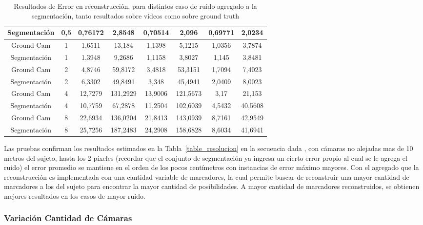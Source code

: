 \begin{table}[h]
\begin{tabular}{cc|c|c|c|c|c|c|}
\multicolumn{1}{|c|}{Segmentación} & 0,5 & 0,76172 & 2,8548 & 0,70514 & 2,096 & 0,69771 & 2,0234 \\ \hline
\multicolumn{1}{|c|}{Ground Cam} & 1 & 1,6511 & 13,184 & 1,1398 & 5,1215 & 1,0356 & 3,7874 \\ \hline
\multicolumn{1}{|c|}{Segmentación} & 1 & 1,3948 & 9,2686 & 1,1158 & 3,8027 & 1,145 & 3,8481 \\ \hline
\multicolumn{1}{|c|}{Ground Cam} & 2 & 4,8746 & 59,8172 & 3,4818 & 53,3151 & 1,7094 & 7,4023 \\ \hline
\multicolumn{1}{|c|}{Segmentación} & 2 & 6,3302 & 49,8491 & 3,348 & 45,4941 & 2,0409 & 8,0023 \\ \hline
\multicolumn{1}{|c|}{Ground Cam} & 4 & 12,7279 & 131,2929 & 13,9006 & 121,5673 & 3,17 & 21,153 \\ \hline
\multicolumn{1}{|c|}{Segmentación} & 4 & 10,7759 & 67,2878 & 11,2504 & 102,6039 & 4,5432 & 40,5608 \\ \hline
\multicolumn{1}{|c|}{Ground Cam} & 8 & 22,6934 & 136,0204 & 21,8413 & 143,0939 & 8,7161 & 42,9549 \\ \hline
\multicolumn{1}{|c|}{Segmentación} & 8 & 25,7256 & 187,2483 & 24,2908 & 158,6828 & 8,6034 & 41,6941 \\ \hline
\end{tabular}
\caption{Resultados de Error en reconstrucción, para distintos caso de ruido agregado a la segmentación, tanto resultados sobre vídeos como sobre ground truth}
\end{table}

Las pruebas confirman los resultados estimados en la Tabla~\ref{table_resolucion} en la secuencia dada , con cámaras no alejadas mas de 10 metros del sujeto, hasta los 2 píxeles (recordar que el conjunto de segmentación ya ingresa un cierto error propio al cual se le agrega el ruido) el error promedio se mantiene en el orden de los pocos centímetros con instancias de error máximo mayores. Con el agregado que la reconstrucción es implementada con una cantidad variable de marcadores, la cual permite buscar de reconstruir una mayor cantidad de marcadores a los del sujeto para encontrar la mayor cantidad de posibilidades. A mayor cantidad de marcadores reconstruidos, se obtienen mejores resultados en los casos de mayor ruido.

\subsubsection{Variación Cantidad de Cámaras}

